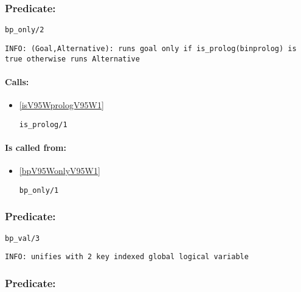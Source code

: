 \subsubsection{Predicate:} \label{bpV95WonlyV95W2}

\begin{verbatim}
bp_only/2
\end{verbatim}

{\small \begin{verbatim}
INFO: (Goal,Alternative): runs goal only if is_prolog(binprolog) is true otherwise runs Alternative

\end{verbatim}}
\paragraph{Calls:} 
\begin{itemize}
\item \ref{isV95WprologV95W1} 
\begin{verbatim}
is_prolog/1
\end{verbatim}

\end{itemize}
\paragraph{Is called from:} 
\begin{itemize}
\item \ref{bpV95WonlyV95W1} 
\begin{verbatim}
bp_only/1
\end{verbatim}

\end{itemize}

\subsubsection{Predicate:} \label{bpV95WvalV95W3}

\begin{verbatim}
bp_val/3
\end{verbatim}

{\small \begin{verbatim}
INFO: unifies with 2 key indexed global logical variable

\end{verbatim}}

\subsubsection{Predicate:} \label{callV95W1}

